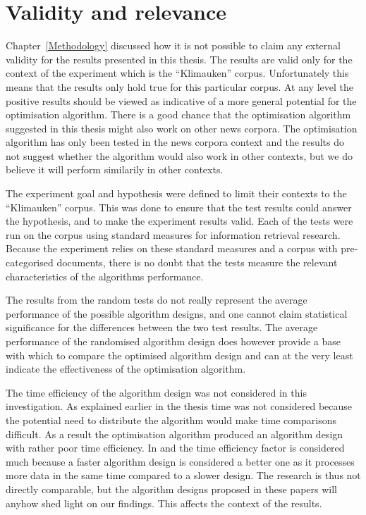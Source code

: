 
\section{Validity and relevance}
\label{ValidityRelevance}
Chapter~\ref{Methodology} discussed how it is not possible to claim any external validity for the results presented in this thesis. The results are valid only for the context of the experiment which is the ``Klimauken'' corpus. Unfortunately this means that the results only hold true for this particular corpus. At any level the positive results should be viewed as indicative of a more general potential for the optimisation algorithm. There is a good chance that the optimisation algorithm suggested in this thesis might also work on other news corpora. The optimisation algorithm has only been tested in the news corpora context and the results do not suggest whether the algorithm would also work in other contexts, but we do believe it will perform similarily in other contexts.

The experiment goal and hypothesis were defined to limit their contexts to the ``Klimauken'' corpus. This was done to ensure that the test results could answer the hypothesis, and to make the experiment results valid. Each of the tests were run on the corpus using standard measures for information retrieval research. Because the experiment relies on these standard measures and a corpus with pre-categorised documents, there is no doubt that the tests measure the relevant characteristics of the \CTC algorithms performance.

The results from the random tests do not really represent the average performance of the possible algorithm designs, and one cannot claim statistical significance for the differences between the two test results. The average performance of the randomised algorithm design does however provide a base with which to compare the optimised algorithm design and can at the very least indicate the effectiveness of the optimisation algorithm.

The time efficiency of the algorithm design was not considered in this investigation. As explained earlier in the thesis time was not considered because the potential need to distribute the algorithm would make time comparisons difficult. As a result the optimisation algorithm produced an algorithm design with rather poor time efficiency. In \cite{Moe2014} and \cite{Moe2013compact} the time efficiency factor is considered much because a faster algorithm design is considered a better one as it processes more data in the same time compared to a slower design. The research is thus not directly comparable, but the algorithm designs proposed in these papers will anyhow shed light on our findings. This affects the context of the results.

